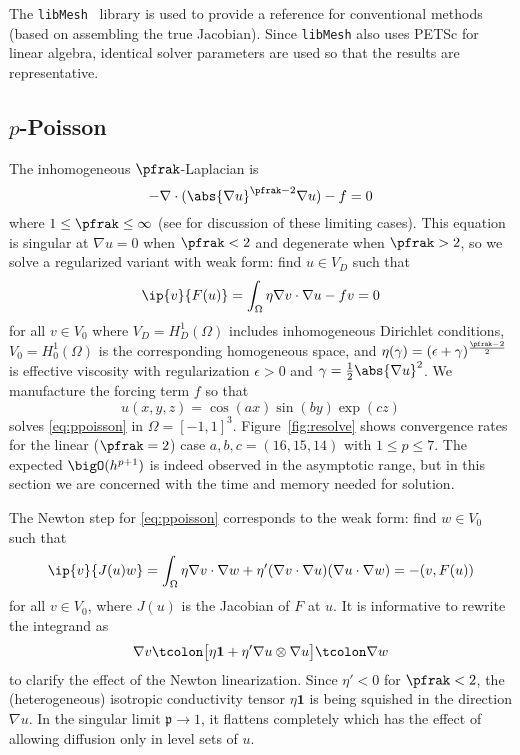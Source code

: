 The \texttt{libMesh}~\cite{libmesh} library is used to provide a reference for conventional methods (based on assembling
the true Jacobian).  Since \texttt{libMesh} also uses PETSc for linear algebra, identical solver parameters are used so
that the results are representative.

\subsection{$p$-Poisson}\label{sec:ppoisson}
The inhomogeneous $\pfrak$-Laplacian is
\begin{equation*}
  -\nabla \cdot (\abs{\nabla u}^{\pfrak-2} \nabla u) - f = 0
\end{equation*}
where $1 \le \pfrak \le \infty$ (see \cite{evans2007lol} for discussion of these limiting cases).  This equation is
singular at $\nabla u = 0$ when $\pfrak<2$ and degenerate when $\pfrak>2$, so we solve a regularized variant with weak
form: find $u \in V_D$ such that
\begin{equation}\label{eq:ppoisson}
  \ip{v}{F(u)} = \int_\Omega \eta \nabla v \cdot \nabla u - f v = 0
\end{equation}
for all $v \in V_0$ where $V_D = H^1_D(\Omega)$ includes inhomogeneous Dirichlet conditions, $V_0 = H^1_0(\Omega)$ is
the corresponding homogeneous space, and $\eta(\gamma) = ( \epsilon + \gamma )^{\frac{\pfrak-2}{2}}$ is effective
viscosity with regularization $\epsilon > 0$ and $\gamma = \frac 1 2 \abs{\nabla u}^2 $.  We manufacture the forcing
term $f$ so that
\[ u(x,y,z) = \cos(ax) \sin(by) \exp(cz) \] solves \eqref{eq:ppoisson} in $\Omega = [-1,1]^3$.  Figure~\ref{fig:resolve}
shows convergence rates for the linear ($\pfrak = 2$) case $a,b,c=(16,15,14)$ with $1 \le p \le 7$.  The expected
$\bigO(h^{p+1})$ is indeed observed in the asymptotic range, but in this section we are concerned with the time and
memory needed for solution.

The Newton step for \eqref{eq:ppoisson} corresponds to the weak form: find $w \in V_0$ such that
\begin{equation*}
  \ip{v}{J(u) w} = \int_\Omega \eta \nabla v \cdot\nabla w + \eta' (\nabla v\cdot\nabla u)(\nabla u\cdot\nabla w) = - (v,F(u))
\end{equation*}
for all $v \in V_0$, where $J(u)$ is the Jacobian of $F$ at $u$.  It is informative to rewrite the integrand as
\begin{equation*}
  \nabla v \tcolon \big[\eta\bm 1 + \eta' \nabla u \otimes \nabla u\big] \tcolon \nabla w
\end{equation*}
to clarify the effect of the Newton linearization.  Since $\eta' < 0$ for $\pfrak < 2$, the (heterogeneous) isotropic
conductivity tensor $\eta\bm 1$ is being squished in the direction $\nabla u$.  In the singular limit $\mathfrak p \to
1$, it flattens completely which has the effect of allowing diffusion only in level sets of $u$.

